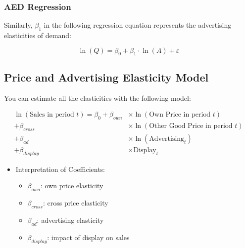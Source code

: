 \documentclass[10pt,article]{article}
\begin{document}
\subsubsection{AED Regression}
\label{sec:orgd55c494}
Similarly, \(\beta_1\) in the following regression equation represents
the advertising elasticities of demand:

\[  \ln(Q) =  \beta_0 + \beta_1 \cdot \ln(A) + \varepsilon \]
\subsection{Price and Advertising Elasticity Model}
\label{sec:org655bb08}
You can estimate all the elasticities with the following model:

\begin{align*}
\ln(\text{Sales in period } t) = \beta_0 + \beta_{own} & \times \ln(\text{Own Price in period } t) \\
                                         + \beta_{cross} & \times \ln(\text{Other Good Price in period } t) \\
                                         + \beta_{ad} & \times \ln (\text{Advertising}_t) \\
                                         + \beta_{display} & \times \text{Display}_t
\end{align*}

\begin{itemize}
\item Interpretation of Coefficients:
\begin{itemize}
\item \(\beta_{own}\): own price elasticity
\item \(\beta_{cross}\): cross price elasticity
\item \(\beta_{ad}\): advertising elasticity
\item \(\beta_{display}\): impact of display on sales
\end{itemize}
\end{itemize}
\end{document}
